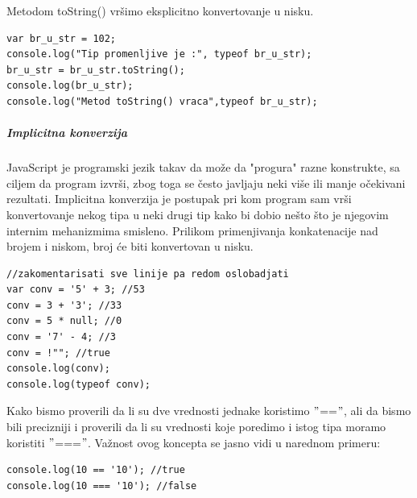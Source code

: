 \documentclass[a4paper]{article}
\begin{document}
Metodom toString() vršimo eksplicitno konvertovanje u nisku.
\begin{lstlisting}[backgroundcolor = \color{lightgray}]
var br_u_str = 102;
console.log("Tip promenljive je :", typeof br_u_str);
br_u_str = br_u_str.toString();
console.log(br_u_str);
console.log("Metod toString() vraca",typeof br_u_str);
\end{lstlisting}

\subparagraph{Implicitna konverzija}
JavaScript je programski jezik takav da može da "progura" razne konstrukte, sa ciljem da program izvrši, zbog toga se često javljaju neki više ili manje očekivani rezultati. Implicitna konverzija je postupak pri kom program sam vrši konvertovanje nekog tipa u neki drugi tip kako bi dobio nešto što je njegovim internim mehanizmima smisleno. Prilikom primenjivanja konkatenacije nad brojem i niskom, broj će biti konvertovan u nisku.
\begin{lstlisting}[backgroundcolor = \color{lightgray}]
//zakomentarisati sve linije pa redom oslobadjati 
var conv = '5' + 3; //53
conv = 3 + '3'; //33
conv = 5 * null; //0
conv = '7' - 4; //3 
conv = !""; //true 
console.log(conv);
console.log(typeof conv);
\end{lstlisting}
Kako bismo proverili da li su dve vrednosti jednake koristimo $"$==$"$, ali da bismo bili precizniji i proverili da li su vrednosti koje poredimo i istog tipa moramo koristiti $"$===$"$. Važnost ovog koncepta se jasno vidi u narednom primeru:
\begin{lstlisting}[backgroundcolor = \color{lightgray}]
console.log(10 == '10'); //true
console.log(10 === '10'); //false
\end{lstlisting}
\end{document}
